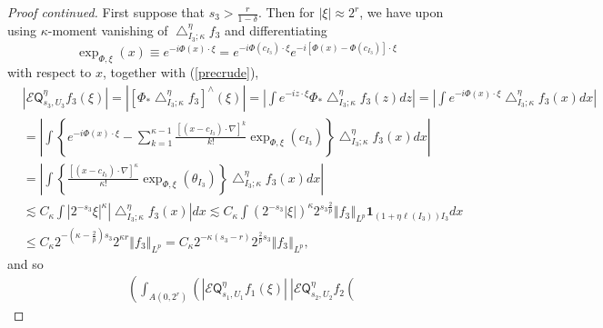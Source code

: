 \documentclass{amsart}%
\theoremstyle{plain}
\numberwithin{equation}{section}
\begin{document}
\begin{proof}
[Proof continued]First suppose that $s_{3}>\frac{r}{1-\delta}$. Then for
$\left\vert \xi\right\vert \approx2^{r}$, we have upon using $\kappa$-moment
vanishing of $\bigtriangleup_{I_{3};\kappa}^{\eta}f_{3}$ and differentiating
\[
\exp_{\Phi,\xi}\left(  x\right)  \equiv e^{-i\Phi\left(  x\right)  \cdot\xi
}=e^{-i\Phi\left(  c_{I_{3}}\right)  \cdot\xi}e^{-i\left[  \Phi\left(
x\right)  -\Phi\left(  c_{I_{3}}\right)  \right]  \cdot\xi}%
\]
with respect to $x$, together with (\ref{precrude}),
\begin{align*}
&  \left\vert \mathcal{E}\mathsf{Q}_{s_{3},U_{3}}^{\eta}f_{3}\left(
\xi\right)  \right\vert =\left\vert \left[  \Phi_{\ast}\bigtriangleup
_{I_{3};\kappa}^{\eta}f_{3}\right]  ^{\wedge}\left(  \xi\right)  \right\vert
=\left\vert \int e^{-iz\cdot\xi}\Phi_{\ast}\bigtriangleup_{I_{3};\kappa}%
^{\eta}f_{3}\left(  z\right)  dz\right\vert =\left\vert \int e^{-i\Phi\left(
x\right)  \cdot\xi}\bigtriangleup_{I_{3};\kappa}^{\eta}f_{3}\left(  x\right)
dx\right\vert \\
&  =\left\vert \int\left\{  e^{-i\Phi\left(  x\right)  \cdot\xi}-\sum
_{k=1}^{\kappa-1}\frac{\left[  \left(  x-c_{I_{3}}\right)  \cdot\nabla\right]
^{k}}{k!}\exp_{\Phi,\xi}\left(  c_{I_{3}}\right)  \right\}  \bigtriangleup
_{I_{3};\kappa}^{\eta}f_{3}\left(  x\right)  dx\right\vert \\
&  =\left\vert \int\left\{  \frac{\left[  \left(  x-c_{I_{3}}\right)
\cdot\nabla\right]  ^{\kappa}}{\kappa!}\exp_{\Phi,\xi}\left(  \theta_{I_{3}%
}\right)  \right\}  \bigtriangleup_{I_{3};\kappa}^{\eta}f_{3}\left(  x\right)
dx\right\vert \\
&  \lesssim C_{\kappa}\int\left\vert 2^{-s_{3}}\xi\right\vert ^{\kappa
}\left\vert \bigtriangleup_{I_{3};\kappa}^{\eta}f_{3}\left(  x\right)
\right\vert dx\lesssim C_{\kappa}\int\left(  2^{-s_{3}}\left\vert
\xi\right\vert \right)  ^{\kappa}2^{s_{3}\frac{2}{p}}\left\Vert f_{3}%
\right\Vert _{L^{p}}\mathbf{1}_{\left(  1+\eta\ell\left(  I_{3}\right)
\right)  I_{3}}dx\\
&  \leq C_{\kappa}2^{-\left(  \kappa-\frac{2}{p}\right)  s_{3}}2^{\kappa
r}\left\Vert f_{3}\right\Vert _{L^{p}}=C_{\kappa}2^{-\kappa\left(
s_{3}-r\right)  }2^{\frac{2}{p}s_{3}}\left\Vert f_{3}\right\Vert _{L^{p}},
\end{align*}
and so%
\begin{align*}
&  \left(  \int_{A\left(  0,2^{r}\right)  }\left(  \left\vert \mathcal{E}%
\mathsf{Q}_{s_{1},U_{1}}^{\eta}f_{1}\left(  \xi\right)  \right\vert
\ \left\vert \mathcal{E}\mathsf{Q}_{s_{2},U_{2}}^{\eta}f_{2}\left(

\end{align*}
\end{proof}
\end{document}
